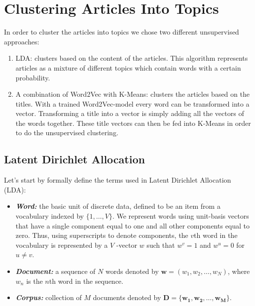 \section{Clustering Articles Into Topics}
\label{sec:topic_detection}

In order to cluster the articles into topics we chose two different unsupervised approaches: 

\begin{enumerate}
\item LDA: clusters based on the content of the articles. This algorithm represents articles as a mixture of different topics which contain words with a certain probability. 
\item A combination of Word2Vec with K-Means: clusters the articles based on the titles. With a trained Word2Vec-model every word can be transformed into a vector. Transforming a title into a vector is simply adding all the vectors of the words together. These title vectors can then be fed into K-Means in order to do the unsupervised clustering.
\end{enumerate}


\subsection{Latent Dirichlet Allocation}
Let's start by formally define the terms used in Latent Dirichlet Allocation (LDA):

\begin{itemize} 
\item \textbf{\textit{Word:}} the basic unit of discrete data, defined to be an item from a vocabulary indexed by
$\{1, \dotsc, V\}$. We represent words using unit-basis vectors that have a single component equal to one and all other components equal to zero. Thus, using superscripts to denote components, the $v$th word in the vocabulary is represented by a $V$ -vector $w$ such that $w^v = 1$ and $w^u = 0$ for $u \neq v$.
\item \textbf{\textit{Document:}}  a sequence of $N$ words denoted by $\mathbf{w} = (w_1, w_2, \dotsc, w_N)$, where $w_n$ is the $n$th word in the sequence.
\item \textbf{\textit{Corpus:}} collection of $M$ documents denoted by $\mathbf{D = \{w_1,w_2, \dotsc, w_M\}}$.
\end{itemize}

